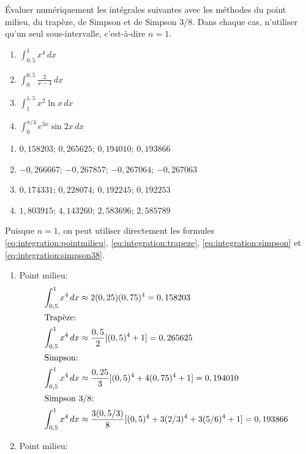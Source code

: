 \begin{exercice}
  Évaluer numériquement les intégrales suivantes avec les méthodes du
  point milieu, du trapèze, de Simpson et de Simpson 3/8. Dans chaque
  cas, n'utiliser qu'un seul sous-intervalle, c'est-à-dire $n = 1$.
  \begin{enumerate}
  \item $\displaystyle\int_{0,5}^1 x^4\, dx$
  \item $\displaystyle\int_0^{0,5} \frac{2}{x - 4}\, dx$
  \item $\displaystyle\int_1^{1,5} x^2 \ln x\, dx$
  \item $\displaystyle\int_0^{\pi/4} e^{3x} \sin 2x\, dx$
  \end{enumerate}
  \begin{rep}
    \begin{enumerate}
    \item $0,158203$; $0,265625$; $0,194010$; $0,193866$
    \item $-0,266667$; $-0,267857$; $-0,267064$; $-0,267063$
    \item $0,174331$; $0,228074$; $0,192245$; $0,192253$
    \item $1,803915$; $4,143260$; $2,583696$; $2,585789$
    \end{enumerate}
  \end{rep}
  \begin{sol}
    Puisque $n = 1$, on peut utiliser directement les formules %
    \eqref{eq:integration:pointmilieu}, %
    \eqref{eq:integration:trapeze}, %
    \eqref{eq:integration:simpson} et %
    \eqref{eq:integration:simpson38}.
    \begin{enumerate}
    \item Point milieu:
      \begin{align*}
        \int_{0,5}^1 x^4\, dx &\approx
        2(0,25) (0,75)^4 = 0,158203 \\
        \intertext{Trapèze:}
        \int_{0,5}^1 x^4\, dx &\approx
        \frac{0,5}{2} [(0,5)^4 + 1] = 0,265625 \\
        \intertext{Simpson:}
        \int_{0,5}^1 x^4\, dx &\approx
        \frac{0,25}{3} [(0,5)^4 + 4(0,75)^4 + 1] = 0,194010 \\
        \intertext{Simpson 3/8:}
        \int_{0,5}^1 x^4\, dx &\approx
        \frac{3(0,5/3)}{8} [(0,5)^4 + 3(2/3)^4 + 3(5/6)^4 + 1] = 0,193866
      \end{align*}
    \item Point milieu:
      \begin{align*}

\end{align*}
\end{enumerate}
\end{sol}
\end{exercice}
